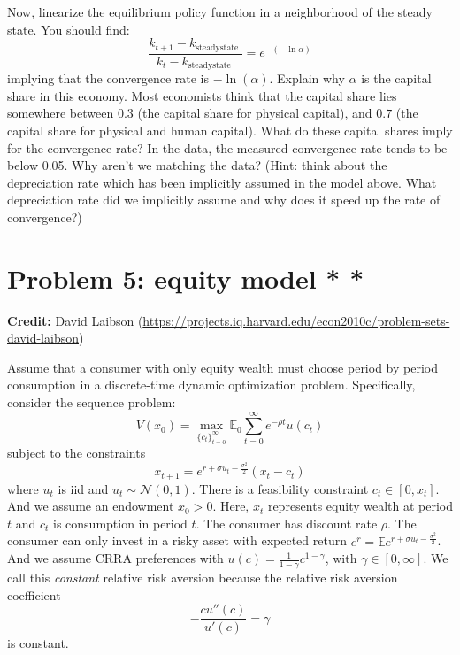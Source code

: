 \documentclass[11pt]{extarticle}
\theoremstyle{plain}
\theoremstyle{definition}
\begin{document}
Now, linearize the equilibrium policy function in a neighborhood of the steady state. You should find:
$$
\frac{k_{t+1}-k_{\text {steadystate }}}{k_t-k_{\text {steadystate }}}=e^{-(-\ln \alpha)}
$$
implying that the convergence rate is $-\ln (\alpha)$. Explain why $\alpha$ is the capital share in this economy. Most economists think that the capital share lies somewhere between $0.3$ (the capital share for physical capital), and $0.7$ (the capital share for physical and human capital). What do these capital shares imply for the convergence rate? In the data, the measured convergence rate tends to be below 0.05. Why aren't we matching the data? (Hint: think about the depreciation rate which has been implicitly assumed in the model above. What depreciation rate did we implicitly assume and why does it speed up the rate of convergence?)


\vspace{10mm}
\section*{Problem 5: equity model  * *}

\textbf{Credit:} David Laibson (\url{https://projects.iq.harvard.edu/econ2010c/problem-sets-david-laibson})

\vspace{5mm}
\noindent
Assume that a consumer with only equity wealth must choose period by period consumption in a discrete-time dynamic optimization problem. Specifically, consider the sequence problem:
\begin{equation*}
	V(x_0) = \max_{ \{ c_t \}_{t=0}^\infty } \mathbb E_0 \sum_{t=0}^\infty e^{- \rho t} u(c_t)
\end{equation*}
subject to the constraints
\begin{equation*}
	x_{t+1} = e^{r + \sigma u_t - \frac{\sigma^2}{2}} (x_t - c_t)
\end{equation*}
where $u_t$ is iid and $u_t \sim \mathcal N(0, 1)$. There is a feasibility constraint $c_t \in [0, x_t]$. And we assume an endowment $x_0 > 0$. Here, $x_t$ represents equity wealth at period $t$ and $c_t$ is consumption in period $t$. The consumer has discount rate $\rho$. The consumer can only invest in a risky asset with expected return $e^r = \mathbb E e^{r + \sigma u_t - \frac{\sigma^2}{2}}$. And we assume CRRA preferences with $u(c) = \frac{1}{1-\gamma} c^{1-\gamma}$, with $\gamma \in [0, \infty]$. We call this \textit{constant} relative risk aversion because the relative risk aversion coefficient
\begin{equation*}
	- \frac{c u''(c)}{u'(c)} = \gamma
\end{equation*}
is constant. 
\end{document}
